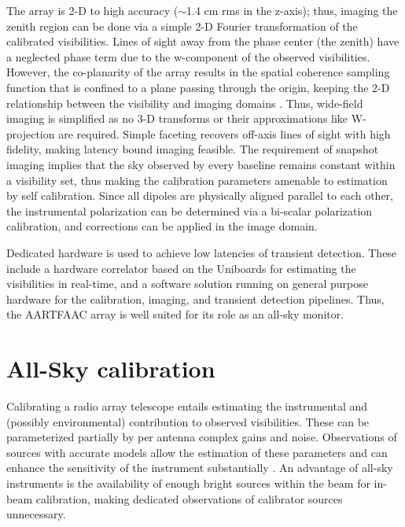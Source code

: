 \documentclass[referee]{aa}
\begin{document}
The  array is  2-D to  high accuracy  ($\sim$1.4 cm  rms in  the  z-axis); thus,
imaging  the  zenith  region  can  be  done  via  a  simple  \mbox{2-D}  Fourier
transformation of  the calibrated  visibilities.  Lines of  sight away  from the
phase center (the zenith) have a  neglected phase term due to the w-component of
the observed  visibilities.  However, the  co-planarity of the array  results in
the  spatial coherence sampling  function that  is confined  to a  plane passing
through  the origin,  keeping the  2-D relationship  between the  visibility and
imaging   domains  \citep{cornwell1992radio}.    Thus,  wide-field   imaging  is
simplified  as  no 3-D  transforms  or  their  approximations like  W-projection
\citep{cornwell2008noncoplanar} are required.  Simple faceting recovers off-axis
lines of  sight with high fidelity,  making latency bound  imaging feasible. The
requirement of snapshot imaging implies  that the sky observed by every baseline
remains constant within a visibility set, thus making the calibration parameters
amenable to  estimation by self  calibration.  Since all dipoles  are physically
aligned parallel to each other,  the instrumental polarization can be determined
via a bi-scalar polarization calibration,  and corrections can be applied in the
image domain.

Dedicated  hardware is  used to  achieve low  latencies of  transient detection.
These include  a hardware correlator based  on the Uniboards  for estimating the
visibilities in  real-time, and a  software solution running on  general purpose
hardware for  the calibration, imaging, and transient  detection pipelines. Thus,
the AARTFAAC array is well suited for its role as an all-sky monitor.

\section{\label{sec:Array-calibration-for}All-Sky calibration}
Calibrating  a radio  array telescope  entails estimating  the  instrumental and
(possibly environmental)  contribution to  observed visibilities.  These  can be
parameterized partially by per antenna  complex gains and noise. Observations of
sources with accurate  models allow the estimation of  these parameters and can
enhance     the     sensitivity      of     the     instrument     substantially
\citep{taylor1999synthesis}.   An  advantage   of  all-sky  instruments  is  the
availability of enough  bright sources within the beam  for in-beam calibration,
making dedicated observations of calibrator sources unnecessary.
\end{document}
